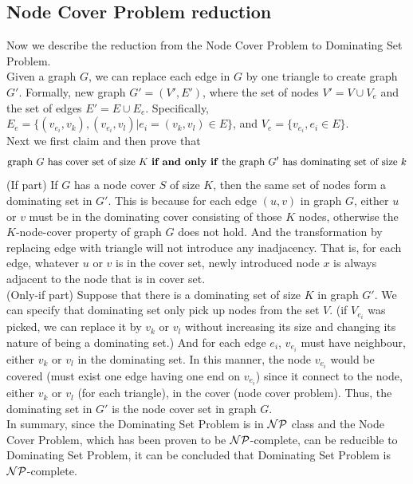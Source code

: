 \documentclass[11pt,a4paper]{article}
\newcommand{\htab}{\hspace*{0.63cm}}
\newcommand{\pg}{\\[0.3cm]}
\begin{document}
\subsection{Node Cover Problem reduction}
\htab Now we describe the reduction from the Node Cover Problem to Dominating Set Problem. \\
\htab Given a graph $G$, we can replace each edge in $G$ by one triangle to create graph $G'$. Formally, new graph $G' = (V',E')$, where the set of nodes $V'= V \cup V_{e}$ and the set of edges $E' = E \cup E_{e}$. Specifically, $E_{e} = \{ (v_{e_{i}}, v_{k}), (v_{e_{i}}, v_{l}) | e_{i} = (v_{k}, v_{l}) \in E\}$, and $V_{e} = \{ v_{e_{i}}, e_{i} \in E\}$. \\
\htab Next we first claim and then prove that 
\begin{align}
    \text{graph $G$ has cover set of size $K$ \textbf{if and only if} the graph $G'$ has dominating set of size $k$}
\end{align}
\htab (If part) If $G$ has a node cover $S$ of size $K$, then the same set of nodes form a dominating set in $G'$. This is because for each edge $(u,v)$ in graph $G$, either $u$ or $v$ must be in the dominating cover consisting of those $K$ nodes, otherwise the $K$-node-cover property of graph $G$ does not hold. And the transformation by replacing edge with triangle will not introduce any inadjacency. That is, for each edge, whatever $u$ or $v$ is in the cover set, newly introduced node $x$ is always adjacent to the node that is in cover set. \\
\htab (Only-if part) Suppose that there is a dominating set of size $K$ in graph $G'$. We can specify that dominating set only pick up nodes from the set $V$. (if $V_{e_{i}}$ was picked, we can replace it by $v_{k}$ or $v_{l}$ without increasing its size and changing its nature of being a dominating set.) And for each edge $e_{i}$, $v_{e_{i}}$ must have neighbour, either $v_{k}$ or $v_{l}$ in the dominating set. In this manner, the node $v_{e_{i}}$ would be covered (must exist one edge having one end on $v_{e_{i}}$) since it connect to the node, either $v_{k}$ or $v_{l}$ (for each triangle), in the cover (node cover problem). Thus, the dominating set in $G'$ is the node cover set in graph $G$. \pg
\htab In summary, since the Dominating Set Problem is in $\mathcal{NP}$ class and the Node Cover Problem, which has been proven to be $\mathcal{NP}$-complete, can be reducible to Dominating Set Problem, it can be concluded that Dominating Set Problem is $\mathcal{NP}$-complete.
\end{document}
